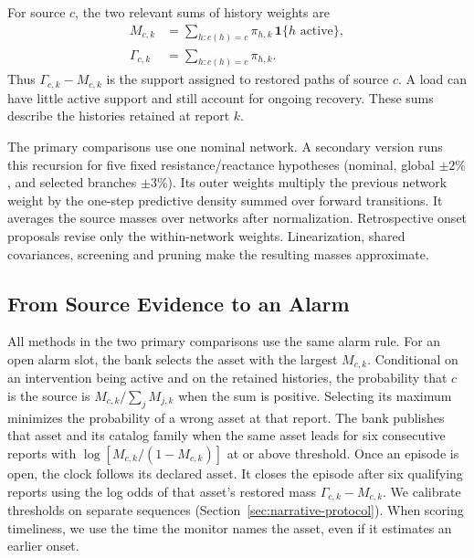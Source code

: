 For source $c$, the two relevant sums of history weights are
\begin{align}
 M_{c,k}&=\sum_{h:c(h)=c}\pi_{h,k}\,\mathbf 1\{h\text{ active}\},\nonumber\\
 \Gamma_{c,k}&=\sum_{h:c(h)=c}\pi_{h,k}.
 \label{eq:active-cause-masses}
\end{align}
Thus $\Gamma_{c,k}-M_{c,k}$ is the support assigned to restored paths
of source $c$. A load can have little active support and still account
for ongoing recovery. These sums describe the histories retained at
report $k$.

The primary comparisons use one nominal network. A secondary version
runs this recursion for five fixed resistance/reactance hypotheses
(nominal, global $\pm2\%$, and selected branches $\pm3\%$). Its outer
weights multiply the previous network weight by the one-step predictive
density summed over forward transitions. It averages the source masses
over networks after normalization. Retrospective onset proposals revise
only the within-network weights. Linearization, shared covariances,
screening and pruning make the resulting masses approximate.

\subsection{From Source Evidence to an Alarm}

All methods in the two primary comparisons use the same alarm rule.
For an open alarm slot, the bank selects the asset with the largest
$M_{c,k}$. Conditional on an intervention being active and on the
retained histories, the probability that $c$ is the source is
$M_{c,k}/\sum_j M_{j,k}$ when the sum is positive. Selecting its
maximum minimizes the probability of a wrong asset at that report.
The bank publishes that asset and its catalog family when the same
asset leads for six consecutive reports with
$\log[M_{c,k}/(1-M_{c,k})]$ at or above threshold. Once an episode
is open, the clock follows its declared asset. It closes the episode
after six qualifying reports using the log odds of that asset's
restored mass $\Gamma_{c,k}-M_{c,k}$. We calibrate thresholds on separate sequences
(Section~\ref{sec:narrative-protocol}). When scoring timeliness, we use
the time the monitor names the asset, even if it estimates an earlier onset.

